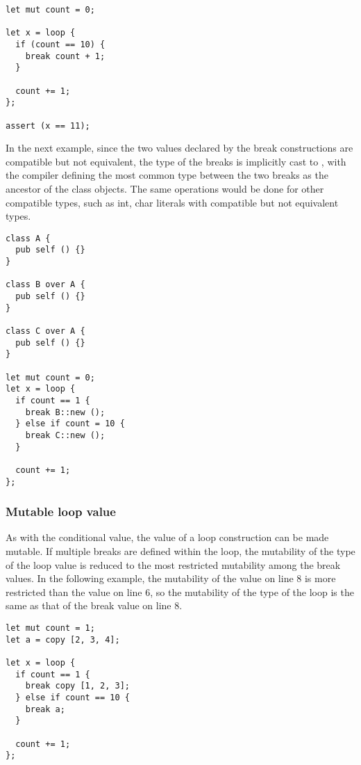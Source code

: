 \begin{lstlisting}[style=coloredverbatim, label=lst:simple_loop_break, caption=Breaking a loop with a value]
let mut count = 0;

let x = loop {
  if (count == 10) {
    break count + 1;
  }

  count += 1;
};

assert (x == 11);
\end{lstlisting}




In the next example, since the two values declared by the break
constructions are compatible but not equivalent, the type of the breaks is
implicitly cast to , with the compiler defining the most common type
between the two breaks as the ancestor of the class objects. The same operations
would be done for other compatible types, such as int, char literals with
compatible but not equivalent types.

\begin{lstlisting}[style=coloredverbatim, escapechar=@]
class A {
  pub self () {}
}

class B over A {
  pub self () {}
}

class C over A {
  pub self () {}
}

let mut count = 0;
let x = loop {
  if count == 1 {
    break B::new ();
  } else if count = 10 {
    break C::new ();
  }

  count += 1;
};
\end{lstlisting}


\subsubsection {Mutable loop value}

As with the conditional value, the value of a loop construction can be made
mutable. If multiple breaks are defined within the loop, the mutability of the
type of the loop value is reduced to the most restricted mutability among the
break values. In the following example, the mutability of the value on line 8 is
more restricted than the value on line 6, so the mutability of the type of the
loop is the same as that of the break value on line 8.

\begin{lstlisting}[style=coloredverbatim, escapechar=@]
let mut count = 1;
let a = copy [2, 3, 4];

let x = loop {
  if count == 1 {
    break copy [1, 2, 3];
  } else if count == 10 {
    break a;
  }

  count += 1;
};
\end{lstlisting}

